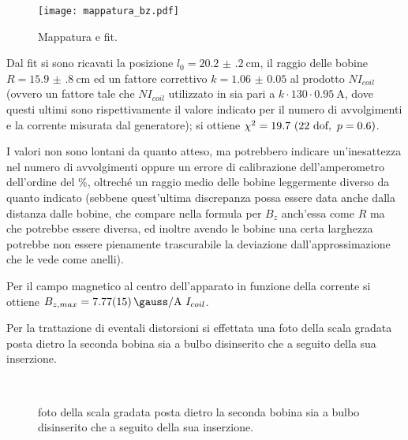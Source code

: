 	\begin{figure}[hb]
		\centering
		\texttt{[image: mappatura\_bz.pdf]}
		\caption{Mappatura e fit.}
		\label{fig:fit1}
	\end{figure}

	Dal fit si sono ricavati la posizione $l_0 = \SI{20.2(2)}{\cm} $, il raggio
	delle bobine $R = \SI{15.9(8)}{\cm}$ ed un fattore correttivo $k = \num{1.06(5)}$
	al prodotto $N I_{coil}$ (ovvero un fattore tale che $N I_{coil}$ utilizzato in 
	sia pari a $k \cdot  130 \cdot  \SI{0.95}{\A}$, dove questi ultimi sono rispettivamente il valore
	indicato per il numero di avvolgimenti e la corrente misurata dal generatore);
	si ottiene $\chi^2 = 19.7 \ (22 \text{ dof} , \  p = 0.6)$.

	I valori non sono lontani da quanto atteso, ma potrebbero indicare un'inesattezza
	nel numero di avvolgimenti oppure un errore di calibrazione dell'amperometro dell'ordine del \%,
	oltreché un raggio medio delle bobine leggermente diverso da quanto indicato
	(sebbene quest'ultima discrepanza possa essere data anche dalla distanza dalle bobine, che compare nella
	formula per $B_z$ anch'essa come $R$ ma che potrebbe essere diversa, ed inoltre avendo le bobine
	una certa larghezza potrebbe non essere pienamente trascurabile la deviazione
	dall'approssimazione che le vede come anelli).

	Per il campo magnetico al centro dell'apparato in funzione della corrente si ottiene
	$B_{z,max} = \SI{7.77(15)}{\gauss\per\A} \ I_{coil}$.

	Per la trattazione di eventali distorsioni
	si effettata una foto della scala gradata posta dietro la seconda bobina sia
	a bulbo disinserito che a seguito della sua inserzione.
	\begin{figure}[hb]
		\centering
		\\
		\caption{foto della scala gradata posta dietro la seconda bobina sia a bulbo disinserito che a seguito della sua inserzione.}
		\label{fig:scala}
	\end{figure}
